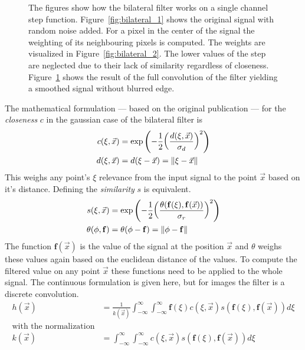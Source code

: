 \begin{figure}[H]
\begin{subfigure}[b]{0.3\linewidth}
        \caption{}\label{fig:bilateral_3}
    \end{subfigure}
    \caption{The figures show how the bilateral filter works on a single channel step function. Figure~\ref{fig:bilateral_1} shows the original signal with random noise added. For a pixel in the center of the signal the weighting of its neighbouring pixels is computed. The weights are visualized in Figure~\ref{fig:bilateral_2}. The lower values of the step are neglected due to their lack of similarity regardless of closeness. Figure~\ref{fig:bilateral_3} shows the result of the full convolution of the filter yielding a smoothed signal without blurred edge.}\label{fig:bilateral_filter}
\end{figure}
The mathematical formulation --- based on the original publication --- for the \emph{closeness} $c$ in the gaussian case of the bilateral filter is
\begin{equation}
\begin{aligned}
    c(\xi, \vec{x})&= \exp\left(-\frac{1}{2}{\left(\frac{d(\xi, \vec{x})}{\sigma_d} \right)}^2 \right) \\
    d(\xi, \vec{x})&= d(\xi - \vec{x}) = \lVert\xi - \vec{x}\rVert
\end{aligned}
\end{equation}
This weighs any point's $\xi$ relevance from the input signal to the point $\vec{x}$ based on it's distance.
Defining the \emph{similarity} $s$ is equivalent.
\begin{equation}
\begin{aligned}
    s(\xi, \vec{x})&= \exp\left(-\frac{1}{2}{\left(\frac{\theta(\mathbf{f}(\xi), \mathbf{f}(\vec{x}))}{\sigma_r}\right)}^2\right) \\
    \theta(\phi, \mathbf{f})&= \theta(\phi - \mathbf{f}) = \lVert\phi - \mathbf{f}\rVert
\end{aligned}
\end{equation}
The function $\mathbf{f}(\vec{x})$ is the value of the signal at the position $\vec{x}$ and $\theta$ weighs these values again based on the euclidean distance of the values.
To compute the filtered value on any point $\vec{x}$ these functions need to be applied to the whole signal.
The continuous formulation is given here, but for images the filter is a discrete convolution.
\begin{equation}
\begin{aligned}
    h(\vec{x}) &= \frac{1}{k(\vec{x})} \int_{-\infty}^{\infty} \int_{-\infty}^{\infty} \mathbf{f}(\xi) c(\xi, \vec{x}) s(\mathbf{f}(\xi), \mathbf{f}(\vec{x})) d\xi \\
    \text{with the normalization} \\
    k(\vec{x}) &= \int_{-\infty}^{\infty} \int_{-\infty}^{\infty} c(\xi, \vec{x}) s(\mathbf{f}(\xi), \mathbf{f}(\vec{x})) d\xi
\end{aligned}
\end{equation}
